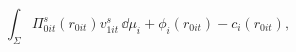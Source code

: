 \begin{equation}\label{equation9}
	\int_{\Sigma}\!\Pi_{0it}^s(r_{0it})v_{1it}^s\,\dd\mu_i+\phi_i(r_{0it})-c_i(r_{0it}),
\end{equation}